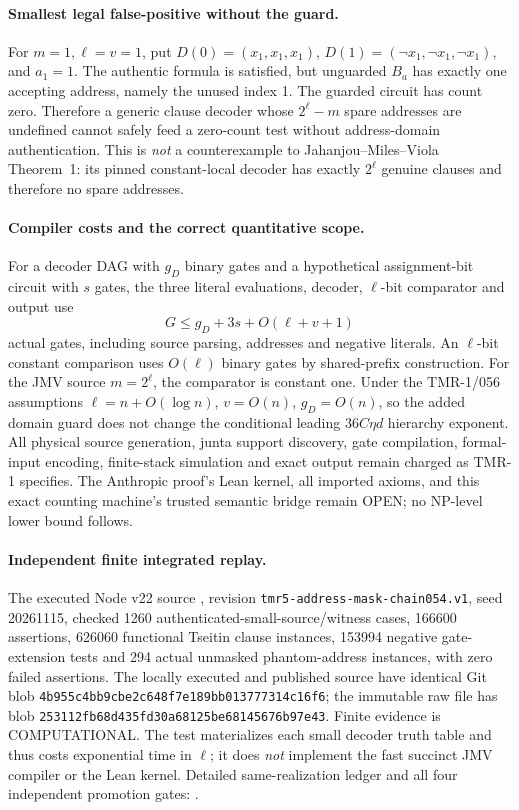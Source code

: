 \documentclass[11pt]{article}
\begin{document}
\paragraph{Smallest legal false-positive without the guard.}
For \(m=1,\ell=v=1\), put \(D(0)=(x_1,x_1,x_1)\),
\(D(1)=(\neg x_1,\neg x_1,\neg x_1)\), and \(a_1=1\).
The authentic formula is satisfied, but unguarded \(B_a\)
has exactly one accepting address, namely the unused index 1.
The guarded circuit has count zero. Therefore a generic clause
decoder whose \(2^\ell-m\) spare addresses are undefined cannot
safely feed a zero-count test without address-domain authentication.
This is \emph{not} a counterexample to Jahanjou--Miles--Viola
Theorem~1: its pinned constant-local decoder has exactly
\(2^\ell\) genuine clauses and therefore no spare addresses.

\paragraph{Compiler costs and the correct quantitative scope.}
For a decoder DAG with \(g_D\) binary gates and a hypothetical
assignment-bit circuit with \(s\) gates, the three literal evaluations,
decoder, \(\ell\)-bit comparator and output use
\[
 G\le g_D+3s+O(\ell+v+1)
\]
actual gates, including source parsing, addresses and negative literals.
An \(\ell\)-bit constant comparison uses \(O(\ell)\) binary gates
by shared-prefix construction. For the JMV source \(m=2^\ell\),
the comparator is constant one. Under the TMR-1/056 assumptions
\(\ell=n+O(\log n)\), \(v=O(n)\), \(g_D=O(n)\), so the added
domain guard does not change the conditional leading
\(36C\eta d\) hierarchy exponent. All physical source generation,
junta support discovery, gate compilation, formal-input encoding,
finite-stack simulation and exact output remain charged as TMR-1
specifies. The Anthropic proof's Lean kernel, all imported axioms,
and this exact counting machine's trusted semantic bridge remain
OPEN; no NP-level lower bound follows.

\paragraph{Independent finite integrated replay.}
The executed Node v22 source
,
revision \texttt{tmr5-address-mask-chain054.v1}, seed 20261115,
checked 1260 authenticated-small-source/witness cases,
166600 assertions, 626060 functional Tseitin clause instances,
153994 negative gate-extension tests and 294 actual unmasked
phantom-address instances, with zero failed assertions.
The locally executed and published source have identical Git
blob \texttt{4b955c4bb9cbe2c648f7e189bb013777314c16f6};
the immutable raw file has blob
\texttt{253112fb68d435fd30a68125be68145676b97e43}.
Finite evidence is COMPUTATIONAL. The test materializes each
small decoder truth table and thus costs exponential time in
\(\ell\); it does \emph{not} implement the fast succinct JMV
compiler or the Lean kernel. Detailed same-realization ledger
and all four independent promotion gates:
.
\end{document}

